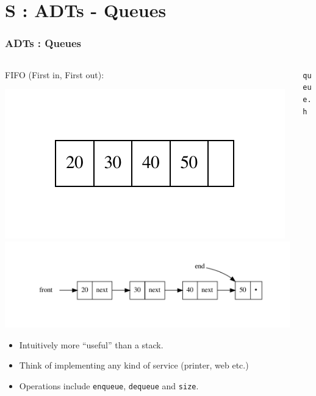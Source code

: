 \section{S : ADTs - Queues}
\label{chap:adts_queues}


\begin{frame}[fragile]
\frametitle{ADTs : Queues}
\begin{columns}[T]

\begin{column}{0.45\textwidth}
FIFO (First in, First out):
\begin{center}
\includegraphics[scale=0.25]{../Images/Fixedq.pdf}
\includegraphics[scale=0.25]{../Images/Linkedq.pdf}
\end{center}
\begin{itemize}[<+->]
\item Intuitively more ``useful'' than a stack.
\item Think of implementing any kind of service (printer, web etc.)
\item Operations include \verb^enqueue^, \verb^dequeue^ and \verb^size^.
\end{itemize}
\end{column}

\pause
\begin{column}{0.45\textwidth}
\verb^queue.h^

\end{column}

\end{columns}
\end{frame}

